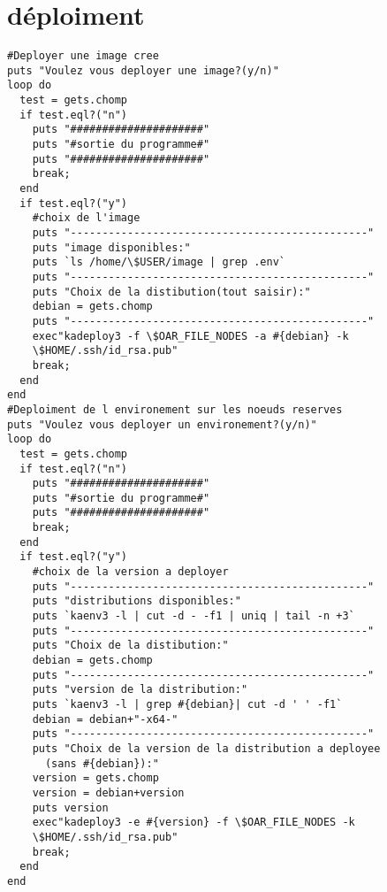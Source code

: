 \section{déploiment}
\begin{lstlisting}
#Deployer une image cree
puts "Voulez vous deployer une image?(y/n)"
loop do
  test = gets.chomp
  if test.eql?("n")
    puts "#####################"
    puts "#sortie du programme#"
    puts "#####################"
    break;
  end
  if test.eql?("y")
    #choix de l'image                                                                                                                 
    puts "-----------------------------------------------"
    puts "image disponibles:"
    puts `ls /home/\$USER/image | grep .env`
    puts "-----------------------------------------------"
    puts "Choix de la distibution(tout saisir):"
    debian = gets.chomp
    puts "-----------------------------------------------"
    exec"kadeploy3 -f \$OAR_FILE_NODES -a #{debian} -k 
	\$HOME/.ssh/id_rsa.pub"
    break;
  end
end
#Deploiment de l environement sur les noeuds reserves                          
puts "Voulez vous deployer un environement?(y/n)"
loop do
  test = gets.chomp
  if test.eql?("n")
    puts "#####################"
    puts "#sortie du programme#"
    puts "#####################"
    break;
  end
  if test.eql?("y")                                                            
    #choix de la version a deployer                                            
    puts "-----------------------------------------------"
    puts "distributions disponibles:"
    puts `kaenv3 -l | cut -d - -f1 | uniq | tail -n +3`
    puts "-----------------------------------------------"
    puts "Choix de la distibution:"
    debian = gets.chomp
    puts "-----------------------------------------------"
    puts "version de la distribution:"
    puts `kaenv3 -l | grep #{debian}| cut -d ' ' -f1`
    debian = debian+"-x64-"
    puts "-----------------------------------------------"
    puts "Choix de la version de la distribution a deployee 
	  (sans #{debian}):"
    version = gets.chomp
    version = debian+version
    puts version
    exec"kadeploy3 -e #{version} -f \$OAR_FILE_NODES -k 
	\$HOME/.ssh/id_rsa.pub"
    break;
  end
end
\end{lstlisting}
